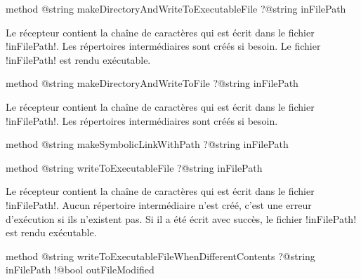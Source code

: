 \begin{galgas4box}
method @string makeDirectoryAndWriteToExecutableFile ?@string inFilePath
\end{galgas4box}

Le récepteur contient la chaîne de caractères qui est écrit dans le fichier \ggsq!inFilePath!. Les répertoires intermédiaires sont créés si besoin. Le fichier \ggsq!inFilePath! est rendu exécutable.








\begin{galgas4box}
method @string makeDirectoryAndWriteToFile ?@string inFilePath
\end{galgas4box}

Le récepteur contient la chaîne de caractères qui est écrit dans le fichier \ggsq!inFilePath!. Les répertoires intermédiaires sont créés si besoin.









\begin{galgas4box}
method @string makeSymbolicLinkWithPath ?@string inFilePath
\end{galgas4box}









\begin{galgas4box}
method @string writeToExecutableFile ?@string inFilePath
\end{galgas4box}

Le récepteur contient la chaîne de caractères qui est écrit dans le fichier \ggsq!inFilePath!. Aucun répertoire intermédiaire n'est créé, c'est une erreur d'exécution si ils n'existent pas. Si il a été écrit avec succès, le fichier \ggsq!inFilePath! est rendu exécutable.










\begin{galgas4box}
method @string writeToExecutableFileWhenDifferentContents
    ?@string inFilePath
    !@bool outFileModified
\end{galgas4box}

